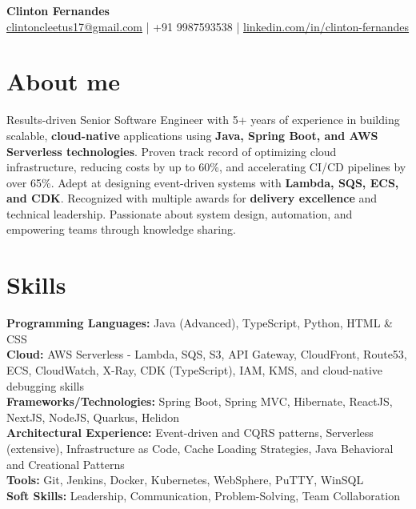 \documentclass[a4paper,10pt]{article}
\begin{document}
\begin{center}
    {\LARGE \textbf{Clinton Fernandes}} \\[0.5em]
    \href{mailto:clintoncleetus17@gmail.com}{clintoncleetus17@gmail.com} \hspace{1em} | \hspace{1em} +91 9987593538 \hspace{1em} | \hspace{1em} \href{https://www.linkedin.com/in/clinton-fernandes-45932915a/}{linkedin.com/in/clinton-fernandes}
\end{center}

\vspace{1em}
\section*{About me}
Results-driven Senior Software Engineer with 5+ years of experience in building scalable, \textbf{cloud-native} applications using \textbf{Java, Spring Boot, and AWS Serverless technologies}. Proven track record of optimizing cloud infrastructure, reducing costs by up to 60\%, and accelerating CI/CD pipelines by over 65\%. Adept at designing event-driven systems with \textbf{Lambda, SQS, ECS, and CDK}. Recognized with multiple awards for \textbf{delivery excellence} and technical leadership. Passionate about system design, automation, and empowering teams through knowledge sharing.

\vspace{1em}
\section*{Skills}
\textbf{Programming Languages:} Java (Advanced), TypeScript, Python, HTML \& CSS \\
\textbf{Cloud:} AWS Serverless - Lambda, SQS, S3, API Gateway, CloudFront, Route53, ECS, CloudWatch, X-Ray, CDK (TypeScript), IAM, KMS, and cloud-native debugging skills \\
\textbf{Frameworks/Technologies:} Spring Boot, Spring MVC, Hibernate, ReactJS, NextJS, NodeJS, Quarkus, Helidon \\
\textbf{Architectural Experience:} Event-driven and CQRS patterns, Serverless (extensive), Infrastructure as Code, Cache Loading Strategies, Java Behavioral and Creational Patterns \\
\textbf{Tools:} Git, Jenkins, Docker, Kubernetes, WebSphere, PuTTY, WinSQL \\
\textbf{Soft Skills:} Leadership, Communication, Problem-Solving, Team Collaboration
\end{document}
